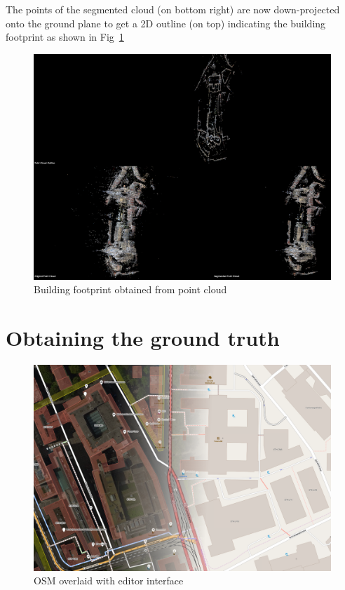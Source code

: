 \documentclass[10pt,twocolumn,letterpaper]{article}
\begin{document}
The points of the segmented cloud (on bottom right) are now down-projected onto the ground plane to get a 2D outline (on top) indicating the building footprint as shown in Fig~\ref{fig:pcl_outline}

\begin{figure}[h]
   \centering
   \includegraphics[width=\linewidth]{images/pcl_outline.png}
   \caption{Building footprint obtained from point cloud}
   \label{fig:pcl_outline}
\end{figure}

\section{Obtaining the ground truth}

\begin{figure}[h]
   \centering
   \includegraphics[width=\linewidth]{images/osm_map.png}
   \caption{OSM overlaid with editor interface}
   \label{fig:figure1}
\end{figure}
\end{document}
